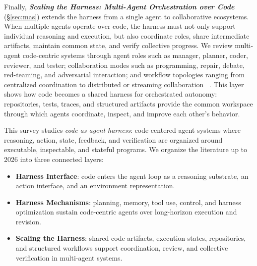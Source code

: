 \documentclass{llmxive}
\begin{document}
Finally, \emph{\textbf{Scaling the Harness: Multi-Agent Orchestration over Code}} (\S\ref{sec:mas}) extends the harness from
a single agent to collaborative ecosystems.
When multiple agents operate over code, the harness must not only
support individual reasoning and execution, but also coordinate
roles, share intermediate artifacts, maintain common state, and
verify collective progress.
We review multi-agent code-centric systems through agent roles
such as manager, planner, coder, reviewer, and tester;
collaboration modes such as programming, repair, debate,
red-teaming, and adversarial interaction; and workflow topologies
ranging from centralized coordination to distributed or streaming
collaboration
~\cite{wu2024autogen,Hong2023MetaGPT,Dong2024SelfCollaboration}.
This layer shows how code becomes a shared harness for
orchestrated autonomy: repositories, tests, traces, and structured
artifacts provide the common workspace through which agents
coordinate, inspect, and improve each other's behavior.

\begin{tcolorbox}[
  agentscope,
  float,
  floatplacement=t
]
This survey studies \emph{code as agent harness}: code-centered agent systems where reasoning, action, state, feedback,
and verification are organized around executable, inspectable, and
stateful programs.
We organize the literature up to 2026 into three connected layers:
\begin{itemize}
    \item \textbf{Harness Interface}: code enters the agent loop
    as a reasoning substrate, an action interface, and an
    environment representation.

    \item \textbf{Harness Mechanisms}: planning, memory, tool use,
    control, and harness optimization sustain code-centric agents over
    long-horizon execution and revision.

    \item \textbf{Scaling the Harness}: shared code artifacts,
    execution states, repositories, and structured workflows
    support coordination, review, and collective verification in
    multi-agent systems.
\end{itemize}


\end{tcolorbox}
\end{document}
